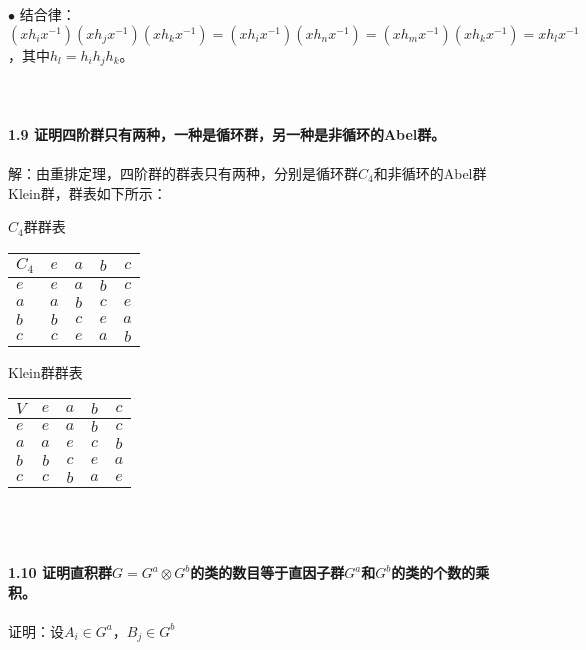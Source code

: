 \documentclass[12pt]{article}
\numberwithin{equation}{section}	 %
\begin{document}
\begin{spacing}{1.5}
$\bullet$ 结合律：$(xh_{i}x^{-1})(xh_{j}x^{-1})(xh_{k}x^{-1}) = (xh_{i}x^{-1})(xh_{n}x^{-1}) = (xh_{m}x^{-1})(xh_{k}x^{-1}) = xh_{l}x^{-1}$，其中$h_{l}=h_{i}h_{j}h_{k}$。\\
~\\
~\\
~\\
\textbf{1.9 \quad 证明四阶群只有两种，一种是循环群，另一种是非循环的Abel群。}\\
~\\
解：由重排定理，四阶群的群表只有两种，分别是循环群$C_{4}$和非循环的Abel群Klein群，群表如下所示：\\
\begin{minipage}{\textwidth}
\begin{minipage}[t]{0.45\textwidth}
  \centering
	\makeatletter{}\makeatother\caption{$C_{4}$群群表}
	\begin{tabular}{l|cccc}  %
		$C_{4}$ & $e$ & $a$ & $b$ & $c$\\  
		\hline  
		$e$ & $e$ & $a$ & $b$ & $c$\\  
		$a$ & $a$ & $b$ & $c$ & $e$\\ 
		$b$ & $b$ & $c$ & $e$ & $a$\\
		$c$ & $c$ & $e$ & $a$ & $b$\\
	\end{tabular}
\end{minipage}
\begin{minipage}[t]{0.45\textwidth}
   \centering
	\makeatletter{}\makeatother\caption{Klein群群表}
	\begin{tabular}{l|cccc}  %
	$V$ & $e$ & $a$ & $b$ & $c$\\  
	\hline  
	$e$ & $e$ & $a$ & $b$ & $c$\\  
	$a$ & $a$ & $e$ & $c$ & $b$\\ 
	$b$ & $b$ & $c$ & $e$ & $a$\\
	$c$ & $c$ & $b$ & $a$ & $e$\\
	\end{tabular}
\end{minipage}
\end{minipage}
~\\
~\\
~\\
\textbf{1.10 \quad 证明直积群$G=G^{a} \otimes G^{b}$的类的数目等于直因子群$G^{a}$和$G^{b}$的类的个数的乘积。}\\
~\\
证明：设$A_{i} \in G^{a}$，$B_{j} \in G^{b}$ \\

\end{spacing}
\end{document}
